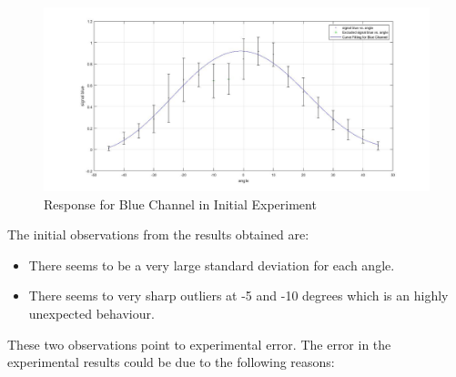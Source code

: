 \begin{figure}[ht]
\centering
\includegraphics[scale=0.25]{pics/BlueChannel.jpg}
\caption{Response for Blue Channel in Initial Experiment}
\label{fig:exp_acc_blu_1}
\end{figure}
The initial observations from the results obtained are:
\begin{itemize}
\item There seems to be a very large standard deviation for each angle.
\item There seems to very sharp outliers at -5 and -10 degrees which is an highly unexpected behaviour.
\end{itemize}
These two observations point to experimental error. The error in the experimental results could be due to the following reasons:
